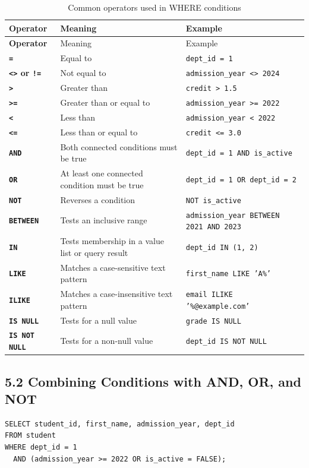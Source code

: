 \documentclass[12pt,a4paper]{article}
\begin{document}
\begingroup
{}
\small
\renewcommand{\arraystretch}{1.25}
\begin{longtable}{>{\bfseries}p{2.5cm} p{4.2cm} p{5.8cm}}
\caption{Common operators used in WHERE conditions}
\label{tab:where_operators}\\
\toprule
Operator & Meaning & Example \\
\midrule
\endfirsthead
\toprule
Operator & Meaning & Example \\
\midrule
\endhead
\bottomrule
\endfoot
\texttt{=} & Equal to & \texttt{dept\_id = 1} \\
\texttt{<>} or \texttt{!=} & Not equal to & \texttt{admission\_year <> 2024} \\
\texttt{>} & Greater than & \texttt{credit > 1.5} \\
\texttt{>=} & Greater than or equal to & \texttt{admission\_year >= 2022} \\
\texttt{<} & Less than & \texttt{admission\_year < 2022} \\
\texttt{<=} & Less than or equal to & \texttt{credit <= 3.0} \\
\texttt{AND} & Both connected conditions must be true & \texttt{dept\_id = 1 AND is\_active} \\
\texttt{OR} & At least one connected condition must be true & \texttt{dept\_id = 1 OR dept\_id = 2} \\
\texttt{NOT} & Reverses a condition & \texttt{NOT is\_active} \\
\texttt{BETWEEN} & Tests an inclusive range & \texttt{admission\_year BETWEEN 2021 AND 2023} \\
\texttt{IN} & Tests membership in a value list or query result & \texttt{dept\_id IN (1, 2)} \\
\texttt{LIKE} & Matches a case-sensitive text pattern & \texttt{first\_name LIKE 'A\%'} \\
\texttt{ILIKE} & Matches a case-insensitive text pattern & \texttt{email ILIKE '\%@example.com'} \\
\texttt{IS NULL} & Tests for a null value & \texttt{grade IS NULL} \\
\texttt{IS NOT NULL} & Tests for a non-null value & \texttt{dept\_id IS NOT NULL} \\
\end{longtable}
\endgroup

\subsection*{5.2 Combining Conditions with AND, OR, and NOT}
\begin{verbatim}
SELECT student_id, first_name, admission_year, dept_id
FROM student
WHERE dept_id = 1
  AND (admission_year >= 2022 OR is_active = FALSE);
\end{verbatim}
\end{document}
